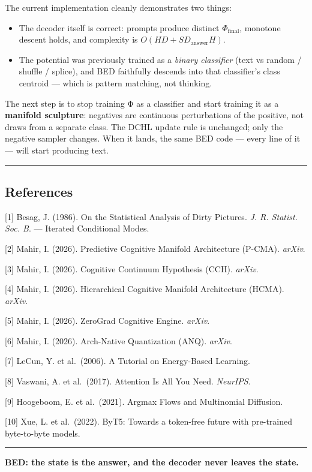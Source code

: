 \documentclass[
  11pt,
  a4paper,
]{article}
\providecommand{\tightlist}{%
  \setlength{\itemsep}{0pt}\setlength{\parskip}{0pt}}
\begin{document}
The current implementation cleanly demonstrates two things:

\begin{itemize}
\tightlist
\item
  The decoder itself is correct: prompts produce distinct
  \(\Phi_{\text{final}}\), monotone descent holds, and complexity is
  \(O(HD + SD_{\text{answer}}H)\).
\item
  The potential was previously trained as a \emph{binary classifier}
  (text vs random / shuffle / splice), and BED faithfully descends into
  that classifier's class centroid --- which is pattern matching, not
  thinking.
\end{itemize}

The next step is to stop training Φ as a classifier and start training
it as a \textbf{manifold sculpture}: negatives are continuous
perturbations of the positive, not draws from a separate class. The DCHL
update rule is unchanged; only the negative sampler changes. When it
lands, the same BED code --- every line of it --- will start producing
text.

\begin{center}\rule{0.5\linewidth}{0.5pt}\end{center}

\subsection{References}\label{references}

{[}1{]} Besag, J. (1986). On the Statistical Analysis of Dirty Pictures.
\emph{J. R. Statist. Soc. B}. --- Iterated Conditional Modes.

{[}2{]} Mahir, I. (2026). Predictive Cognitive Manifold Architecture
(P-CMA). \emph{arXiv}.

{[}3{]} Mahir, I. (2026). Cognitive Continuum Hypothesis (CCH).
\emph{arXiv}.

{[}4{]} Mahir, I. (2026). Hierarchical Cognitive Manifold Architecture
(HCMA). \emph{arXiv}.

{[}5{]} Mahir, I. (2026). ZeroGrad Cognitive Engine. \emph{arXiv}.

{[}6{]} Mahir, I. (2026). Arch-Native Quantization (ANQ). \emph{arXiv}.

{[}7{]} LeCun, Y. et al.~(2006). A Tutorial on Energy-Based Learning.

{[}8{]} Vaswani, A. et al.~(2017). Attention Is All You Need.
\emph{NeurIPS}.

{[}9{]} Hoogeboom, E. et al.~(2021). Argmax Flows and Multinomial
Diffusion.

{[}10{]} Xue, L. et al.~(2022). ByT5: Towards a token-free future with
pre-trained byte-to-byte models.

\begin{center}\rule{0.5\linewidth}{0.5pt}\end{center}

\textbf{BED: the state is the answer, and the decoder never leaves the
state.}
\end{document}
